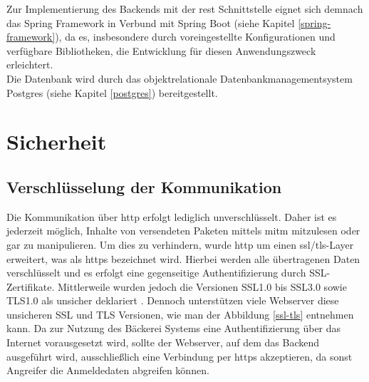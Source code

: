 Zur Implementierung des Backends mit der \gls{rest} Schnittstelle eignet sich demnach das Spring Framework in Verbund mit Spring Boot (siehe Kapitel \ref{spring-framework}), da es, insbesondere durch voreingestellte Konfigurationen und verfügbare Bibliotheken, die Entwicklung für diesen Anwendungszweck erleichtert. 
\\
Die Datenbank wird durch das objektrelationale Datenbankmanagementsystem Postgres (siehe Kapitel \ref{postgres}) bereitgestellt.

\clearpage

\section{Sicherheit}

\subsection{Verschlüsselung der Kommunikation}
Die Kommunikation über \gls{http} erfolgt lediglich unverschlüsselt.
Daher ist es jederzeit möglich, Inhalte von versendeten Paketen mittels \gls{mitm} mitzulesen oder gar zu manipulieren.
Um dies zu verhindern, wurde \gls{http} um einen \gls{ssl}/\gls{tls}-Layer erweitert, was als \gls{https} bezeichnet wird.
Hierbei werden alle übertragenen Daten verschlüsselt und es erfolgt eine gegenseitige Authentifizierung durch SSL-Zertifikate.
Mittlerweile wurden jedoch die Versionen SSL1.0 bis SSL3.0 sowie TLS1.0 als unsicher deklariert \cite{ssl}. 
Dennoch unterstützen viele Webserver diese unsicheren SSL und TLS Versionen, wie man der Abbildung \ref{ssl-tls} entnehmen kann.
Da zur Nutzung des Bäckerei Systems eine Authentifizierung über das Internet vorausgesetzt wird, sollte der Webserver, auf dem das Backend ausgeführt wird, ausschließlich eine Verbindung per \gls{https} akzeptieren, da sonst Angreifer die Anmeldedaten abgreifen können. 


\clearpage

